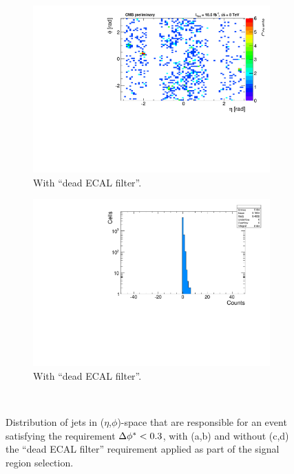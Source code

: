 \begin{figure}[h!]
\begin{center}
    \begin{subfigure}[b]{0.46\textwidth}
      \includegraphics[width=\textwidth]{Figs/dphi/Nominal_AlphaT_thresholds/th2d_numer_summed_ge2j_ge0b_200.pdf}
      \caption{With ``dead ECAL filter''.}
      \label{fig:hotspots_2d_withdeadECAL}
    \end{subfigure}
    \begin{subfigure}[b]{0.46\textwidth}
      \includegraphics[width=\textwidth]{Figs/dphi/Nominal_AlphaT_thresholds/th1d_numer_summed_ge2j_ge0b_200.pdf}
      \caption{With ``dead ECAL filter''.}
      \label{fig:hotspots_1d_withdeadECAL}
    \end{subfigure} \\ 
    \caption{Distribution of jets in ($\eta$,$\phi$)-space that are
      responsible for an event satisfying the requirement $\Delta \phi^* <
      0.3$, with (a,b) and without (c,d) the ``dead ECAL filter''
      requirement applied as part of the signal region selection.}
    \label{fig:hotspots}
  \end{center}
\end{figure}

